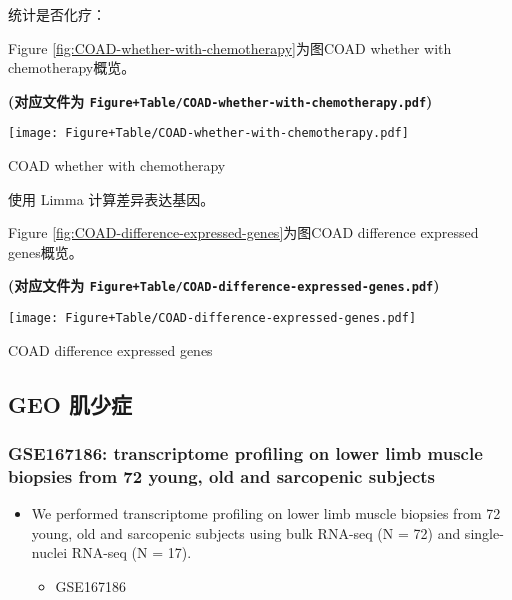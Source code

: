 \documentclass[
]{article}
\providecommand{\tightlist}{%
  \setlength{\itemsep}{0pt}\setlength{\parskip}{0pt}}
\begin{document}
统计是否化疗：

Figure \ref{fig:COAD-whether-with-chemotherapy}为图COAD whether with chemotherapy概览。

\textbf{(对应文件为 \texttt{Figure+Table/COAD-whether-with-chemotherapy.pdf})}

\def\@captype{figure}
\begin{center}
\texttt{[image: Figure+Table/COAD-whether-with-chemotherapy.pdf]}
\caption{COAD whether with chemotherapy}\label{fig:COAD-whether-with-chemotherapy}
\end{center}

使用 Limma 计算差异表达基因。

Figure \ref{fig:COAD-difference-expressed-genes}为图COAD difference expressed genes概览。

\textbf{(对应文件为 \texttt{Figure+Table/COAD-difference-expressed-genes.pdf})}

\def\@captype{figure}
\begin{center}
\texttt{[image: Figure+Table/COAD-difference-expressed-genes.pdf]}
\caption{COAD difference expressed genes}\label{fig:COAD-difference-expressed-genes}
\end{center}

\hypertarget{geo-ux808cux5c11ux75c7}{%
\subsection{GEO 肌少症}\label{geo-ux808cux5c11ux75c7}}

\hypertarget{gse167186-transcriptome-profiling-on-lower-limb-muscle-biopsies-from-72-young-old-and-sarcopenic-subjects}{%
\subsubsection{GSE167186: transcriptome profiling on lower limb muscle biopsies from 72 young, old and sarcopenic subjects}\label{gse167186-transcriptome-profiling-on-lower-limb-muscle-biopsies-from-72-young-old-and-sarcopenic-subjects}}

\begin{itemize}
\tightlist
\item
  We performed transcriptome profiling on lower limb muscle biopsies from 72 young, old and sarcopenic subjects using bulk RNA-seq (N = 72) and single-nuclei RNA-seq (N = 17).

  \begin{itemize}
  \tightlist
  \item
    GSE167186
  \end{itemize}
\end{itemize}
\end{document}
